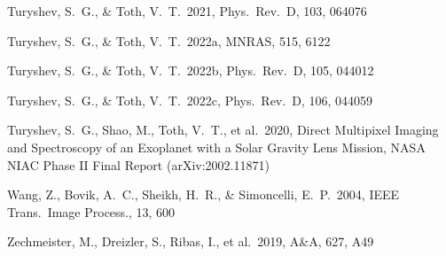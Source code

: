 ﻿\documentclass[twocolumn]{emulateapj}
\begin{document}
\begin{thebibliography}{}
Turyshev, S.~G., \& Toth, V.~T.\ 2021, Phys.\ Rev.\ D, 103, 064076

Turyshev, S.~G., \& Toth, V.~T.\ 2022a, MNRAS, 515, 6122

Turyshev, S.~G., \& Toth, V.~T.\ 2022b, Phys.\ Rev.\ D, 105, 044012

Turyshev, S.~G., \& Toth, V.~T.\ 2022c, Phys.\ Rev.\ D, 106, 044059

Turyshev, S.~G., Shao, M., Toth, V.~T., et al.\ 2020, Direct Multipixel
Imaging and Spectroscopy of an Exoplanet with a Solar Gravity Lens
Mission, NASA NIAC Phase II Final Report (arXiv:2002.11871)

Wang, Z., Bovik, A.~C., Sheikh, H.~R., \& Simoncelli, E.~P.\ 2004, IEEE
Trans.\ Image Process., 13, 600

Zechmeister, M., Dreizler, S., Ribas, I., et al.\ 2019, A\&A, 627, A49

\end{thebibliography}
\end{document}
